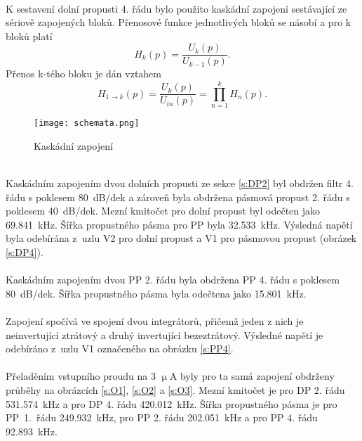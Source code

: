 \\
\noindent K sestavení dolní propusti 4. řádu bylo použito kaskádní zapojení sestávající ze sériově zapojených bloků. Přenosové funkce jednotlivých bloků se násobí a pro k bloků platí
\begin{equation}
H_k(p) = \frac{U_k (p)}{U_{k-1}(p)}.
\end{equation}
Přenos k-tého bloku je dán vztahem
\begin{equation}
H_{1 \rightarrow k}(p) = \frac{U_k (p)}{U_{in}(p)} = \prod _{n=1}^{k} H_n(p).
\end{equation}
\begin{figure}[h]
\centering
\texttt{[image: schemata.png]}
\caption[Kaskádní zapojení]{Kaskádní zapojení \cite{9}}
\end{figure}
\\
\noindent Kaskádním zapojením dvou dolních propusti ze sekce \ref{s:DP2} byl obdržen filtr 4. řádu s poklesem 80~dB/dek a zároveň byla obdržena pásmová propust 2. řádu s poklesem 40~dB/dek. Mezní kmitočet pro dolní propust byl odečten jako 69.841~kHz. Šířka propustného pásma pro PP byla 32.533~kHz. Výsledná napětí byla odebírána z~uzlu V2 pro dolní propust a V1 pro pásmovou propust (obrázek \ref{s:DP4}). \\
\\
\noindent Kaskádním zapojením dvou PP 2. řádu byla obdržena PP 4. řádu s poklesem 80~dB/dek. Šířka propustného pásma byla odečtena jako 15.801~kHz.\\ 
\\
Zapojení spočívá ve spojení dvou integrátorů, přičemž jeden z nich je neinvertující ztrátový a druhý invertující bezeztrátový. Výsledné napětí je odebíráno z~uzlu V1 označeného na obrázku \ref{s:PP4}.\\
\\
\noindent Přeladěním vstupního proudu na 3 $\upmu$A byly pro ta samá zapojení obdrženy průběhy na obrázcích \ref{s:O1}, \ref{s:O2} a  \ref{s:O3}. Mezní kmitočet je pro DP 2. řádu 531.574~kHz a pro DP 4. řádu 420.012~kHz. Šířka propustného pásma je pro PP~1.~řádu 249.932~kHz, pro PP 2. řádu 202.051~kHz a pro PP 4. řádu 92.893~kHz.